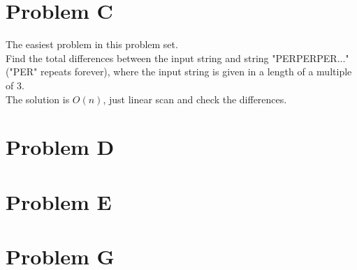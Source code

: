 \documentclass[10pt]{article}
\begin{document}
\newpage



\section*{Problem C}

The easiest problem in this problem set.\\

Find the total differences between the input string and string "PERPERPER..." ("PER" repeats forever), where the input string is given in a length of a multiple of 3.\\

The solution is $O(n)$, just linear scan and check the differences.\\



\newpage



\section*{Problem D}



\newpage



\section*{Problem E}



\newpage



\section*{Problem G}



\newpage
\end{document}
